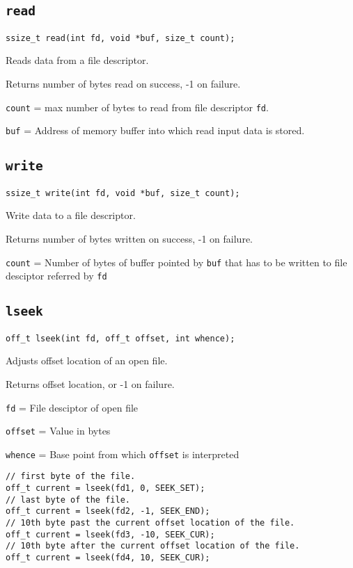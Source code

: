 \documentclass{article}
\begin{document}
\subsection{\texttt{read}}

\begin{verbatim}
ssize_t read(int fd, void *buf, size_t count);
\end{verbatim}

Reads data from a file descriptor.

Returns number of bytes read on success, -1 on failure.

\texttt{count} = max number of bytes to read from file descriptor \texttt{fd}.

\texttt{buf} = Address of memory buffer into which read input data is stored.


\subsection{\texttt{write}}

\begin{verbatim}
ssize_t write(int fd, void *buf, size_t count);
\end{verbatim}

Write data to a file descriptor.

Returns number of bytes written on success, -1 on failure.

\texttt{count} = Number of bytes of buffer pointed by \texttt{buf} that has to be written to file desciptor referred by \texttt{fd}


\subsection{\texttt{lseek}}

\begin{verbatim}
off_t lseek(int fd, off_t offset, int whence);
\end{verbatim}

Adjusts offset location of an open file.

Returns offset location, or -1 on failure.

\texttt{fd} = File desciptor of open file

\texttt{offset} = Value in bytes

\texttt{whence} = Base point from which \texttt{offset} is interpreted

\begin{verbatim}
// first byte of the file.
off_t current = lseek(fd1, 0, SEEK_SET);
// last byte of the file.
off_t current = lseek(fd2, -1, SEEK_END);
// 10th byte past the current offset location of the file.
off_t current = lseek(fd3, -10, SEEK_CUR);
// 10th byte after the current offset location of the file.
off_t current = lseek(fd4, 10, SEEK_CUR);
\end{verbatim}
\end{document}
